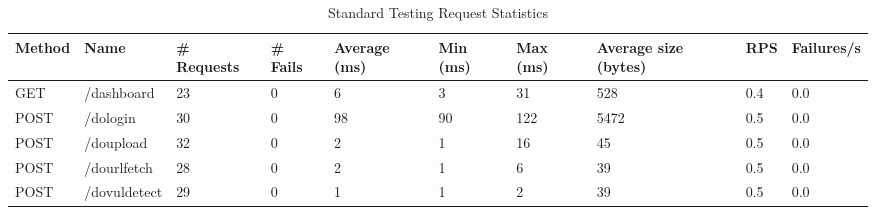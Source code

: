 \begin{table*}[h]
  \caption{Standard Testing Request Statistics}
  \label{tab:stdreqstat}
  \begin{tabular}{|p{}|p{}|p{}|p{}|p{}|p{}|p{}|p{}|p{}|p{}|}
    \hline
  {\textbf{Method}} & {\textbf{Name}} & {\textbf{\# Requests}} & {\textbf{\# Fails}} & {\textbf{Average (ms)}} & {\textbf{Min (ms)}} & {\textbf{Max (ms)}} & {\textbf{Average size (bytes)}} & {\textbf{RPS}} & {\textbf{Failures/s}} \\ \hline
  GET                                   & /dashboard                         & 23                                        & 0                                      & 6                                          & 3                                      & 31                                     & 528                                                & 0.4                               & 0.0                                      \\ \hline
  {\color[HTML]{2A2B2E} POST}           & /dologin                           & 30                                        & 0                                      & 98                                         & 90                                     & 122                                    & 5472                                               & 0.5                               & 0.0                                      \\ \hline
  {\color[HTML]{2A2B2E} POST}           & /doupload                          & 32                                        & 0                                      & 2                                          & 1                                      & 16                                     & 45                                                 & 0.5                               & 0.0                                      \\ \hline
  POST                                  & /dourlfetch                        & 28                                        & 0                                      & 2                                          & 1                                      & 6                                      & 39                                                 & 0.5                               & 0.0                                      \\ \hline
  POST                                  & /dovuldetect                       & 29                                        & 0                                      & 1                                          & 1                                      & 2                                      & 39                                                 & 0.5                               & 0.0                                      \\ \hline

\end{tabular}
\end{table*}
